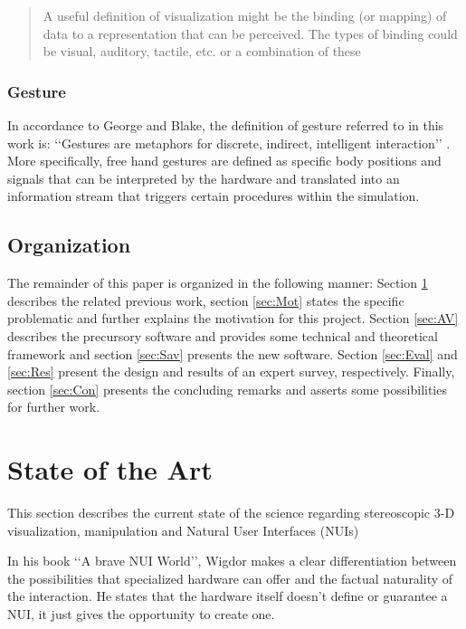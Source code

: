 \documentclass[12pt]{extarticle}
\begin{document}
\begin{quotation}A useful definition of visualization might be the binding (or mapping) of data to a representation that can be perceived. The types of binding could be visual, auditory, tactile, etc. or a combination of these
\end{quotation}

\subsubsection {Gesture} In accordance to George and Blake, the definition of gesture referred to in this work is: \lq\lq{}Gestures are metaphors for discrete, indirect, intelligent interaction\rq\rq{} \cite{GestureDef}. More specifically, free hand gestures are defined as specific body positions and signals that can be interpreted by the hardware and translated into an information stream that triggers certain procedures within the simulation.
\subsection{Organization}
The remainder of this paper is organized in the following
manner: Section \ref{sec:Soa} describes the related previous work, section \ref{sec:Mot} states the specific problematic and further explains the motivation for this project. Section \ref{sec:AV} describes the precursory software and provides some technical and theoretical framework and section \ref{sec:Sav} presents the new software. Section \ref{sec:Eval} and \ref{sec:Res} present the design and results of an expert survey, respectively. Finally, section \ref{sec:Con} presents the concluding remarks and asserts some possibilities for further work.

\section{State of the Art}\label{sec:Soa}
This section describes the current state of the science regarding stereoscopic 3-D visualization, manipulation and Natural User Interfaces (NUIs)

In his book \lq\lq{}A brave NUI World\rq\rq{}\cite{NUIWorld}, Wigdor makes a clear differentiation between the possibilities that specialized hardware can offer and the factual naturality of the interaction. He states that the hardware itself doesn\rq{}t define or guarantee a NUI, it just gives the opportunity to create one. 
\end{document}
